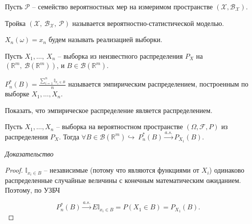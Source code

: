 Пусть $\displaystyle \mathcal{P}$ -- семейство вероятностных мер на измеримом пространстве $\displaystyle (\mathcal{X} ,\mathcal{B}_{\mathcal{X}})$.
\begin{definition}
	Тройка $\displaystyle (\mathcal{X},\ \mathcal{B}_{\mathcal{X}},\ \mathcal{P})$ называется вероятностно-статистической моделью.
\end{definition}
\begin{definition}
	$\displaystyle X_{n}( \omega ) =x_{n}$ будем называть реализацией выборки.
\end{definition}
Пусть $\displaystyle X_{1} ,\dotsc,\ X_{n}$ -- выборка из неизвестного распределения $\displaystyle P_{X}$ на $\displaystyle \left(\mathbb{R}^{m},\ \mathcal{B}\left(\mathbb{R}^{m}\right)\right)$, и $\displaystyle B\in \mathcal{B}\left(\mathbb{R}^{m}\right)$.
\begin{definition}
	$\displaystyle P_{n}^{*}( B) =\frac{\sum _{i=1}^{n}\mathbb{I}_{x_{i} \in B}}{n}$ называется эмпирическим распределением, построенным по выборке $\displaystyle X_{1} ,\dotsc ,X_{n}$.
\end{definition}
\begin{exercise}
	Показать, что эмпирическое распределение является распределением.
\end{exercise}
\begin{proposition}
	Пусть $\displaystyle X_{1} ,\dotsc ,X_{n}$ -- выборка на вероятностном пространстве $\displaystyle ( \Omega ,\mathcal{F} ,P)$ из распределения $\displaystyle P_{X}$. Тогда $\displaystyle \forall B\in \mathcal{B}\left(\mathbb{R}^{m}\right) \hookrightarrow \ P_{n}^{*}( B)\xrightarrow{a.s.} P_{X_{1}}( B)$.
\end{proposition}
\textit{Доказательство}
\begin{proof}
    $\displaystyle \mathbb{I}_{x_{i} \in B}$ -- независимые (потому что являются функциями от $\displaystyle X_{i}$) одинаково распределенные случайные величины с конечным математическим ожиданием. Поэтому, по УЗБЧ
    
    \begin{equation*}
    	P_{n}^{*}( B)\xrightarrow{a.s.} E\mathbb{I}_{x_{i} \in B} =P( X_{1} \in B) =P_{X_{1}}( B).
    \end{equation*}
\end{proof}

